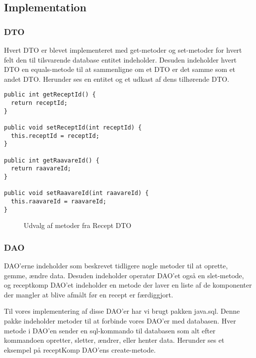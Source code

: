 \documentclass[a4paper]{article}
\begin{document}


\subsection{Implementation} %

\subsubsection{DTO} %

Hvert DTO er blevet implementeret med get-metoder og set-metoder for hvert felt den til tilsvarende database entitet indeholder. Desuden indeholder hvert DTO en equals-metode til at sammenligne om et DTO er det samme som et andet DTO. Herunder ses en entitet og et udkast af dens tilhørende DTO.

\begin{lstlisting}
public int getReceptId() {
  return receptId;
}

public void setReceptId(int receptId) {
  this.receptId = receptId;
}

public int getRaavareId() {
  return raavareId;
}

public void setRaavareId(int raavareId) {
  this.raavareId = raavareId;
}
\end{lstlisting}
\begin{figure}[h!]
  \caption{Udvalg af metoder fra Recept DTO}
\end{figure}



\subsubsection{DAO} %

DAO’erne indeholder som beskrevet tidligere nogle metoder til at oprette, gemme, ændre data. Desuden indeholder operatør DAO’et også en slet-metode, og receptkomp DAO’et indeholder en metode der laver en liste af de komponenter der mangler at blive afmålt før en recept er færdiggjort.

Til vores implementering af disse DAO’er har vi brugt pakken java.sql. Denne pakke indeholder metoder til at forbinde vores DAO’er med databasen. Hver metode i DAO’en sender en sql-kommando til databasen som alt efter kommandoen opretter, sletter, ændrer, eller henter data. Herunder ses et eksempel på receptKomp DAO’ens create-metode.
\end{document}
